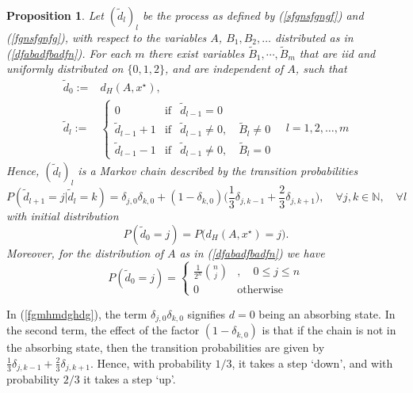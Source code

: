 \documentclass[a4paper,aps,floatfix]{revtex4}
\newtheorem{proposition}[theorem]{Proposition}
\begin{document}
\begin{proposition}
\label{adfbdfsgnsrgnr}
Let $(\tilde{d}_l)_{l}$ be the process as defined by (\ref{sfgnsfgngf}) and (\ref{fgnsfgnfg}), with respect  to the variables $A$, $B_1,B_2,\ldots$ distributed as in (\ref{dfabadfbadfn}). For each $m$ there exist
variables $\tilde{B}_1,\cdots,\tilde{B}_m$ that are iid and uniformly distributed on $\{0,1,2\}$, and are independent of $A$, such  that
\begin{equation}
\label{fdnsfnmAgain}
\begin{split}
\tilde{d}_0 := &  d_H(A,x^{\star}),\\
\tilde{d}_{l} := & \left\{\begin{matrix}
0 & \mathrm{if} & \tilde{d}_{l-1} = 0\\
\tilde{d}_{l-1} + 1 & \mathrm{if} & \tilde{d}_{l-1} \neq 0,\quad  \tilde{B}_l  \neq 0\\
\tilde{d}_{l-1} - 1 & \mathrm{if} &  \tilde{d}_{l-1} \neq 0,\quad
\tilde{B}_l  = 0
\end{matrix}\right. \quad l = 1,2,\ldots,m
\end{split}
\end{equation}
Hence, $(\tilde{d}_l)_{l}$ is a Markov chain described by the transition probabilities
\begin{equation}
\label{fgmhmdghdg}
P(\tilde{d}_{l+1} = j|\tilde{d}_{l} = k) = \delta_{j,0}\delta_{k,0} + (1-\delta_{k,0})\big(\frac{1}{3}\delta_{j,k-1} +\frac{2}{3}\delta_{j,k+1}\big),\quad \forall j,k\in\mathbb{N},\quad \forall l
\end{equation}
with initial distribution
\begin{equation}
P(\tilde{d}_0 = j) = P\big(d_H(A,x^{\star})= j\big).
\end{equation}
Moreover, for the distribution of $A$ as in  (\ref{dfabadfbadfn}) we have
\begin{equation}
\label{afadaanen}
P(\tilde{d}_0 = j) = \left\{\begin{matrix} \frac{1}{2^n}\binom{n}{j}&,\quad 0\leq j\leq n\\
0&  \mathrm{otherwise}
\end{matrix}\right.
\end{equation}

\end{proposition}
In (\ref{fgmhmdghdg}), the term $\delta_{j,0}\delta_{k,0}$ signifies $d = 0$ being an absorbing state. In the second term, the effect of the factor  $(1-\delta_{k,0})$ is that if the chain is not in the absorbing state, then the transition probabilities are given by $\frac{1}{3}\delta_{j,k-1} +\frac{2}{3}\delta_{j,k+1}$. Hence, with probability $1/3$, it takes a step `down', and with probability $2/3$ it takes a step `up'.
\end{document}

